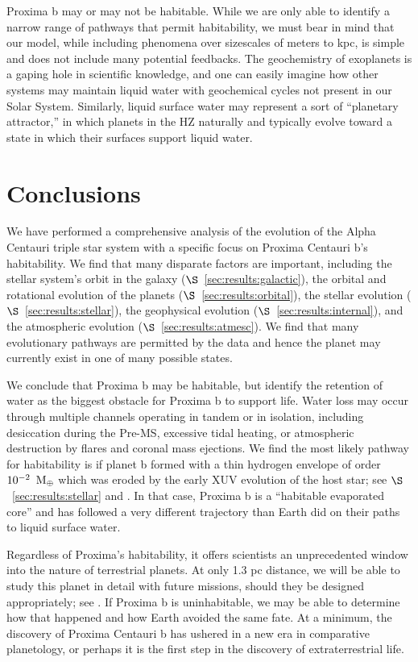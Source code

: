 \documentclass[preprint,12pt]{aastex}
\def\mearth{{\rm\,M_\oplus}}
\begin{document}
Proxima b may or may not be habitable. While we are only able to
identify a narrow range of pathways that permit habitability, we must
bear in mind that our model, while including phenomena over sizescales
of meters to kpc, is simple and does not include many potential
feedbacks. The geochemistry of exoplanets is a gaping hole in
scientific knowledge, and one can easily imagine how other systems may
maintain liquid water with geochemical cycles not present in our Solar
System. Similarly, liquid surface water may represent a sort of
``planetary attractor,'' in which planets in the HZ naturally and
typically evolve toward a state in which their surfaces support liquid
water.

\section{Conclusions\label{sec:concl}}
We have performed a comprehensive analysis of the evolution of the
Alpha Centauri triple star system with a specific focus on Proxima
Centauri b's habitability. We find that many disparate factors are
important, including the stellar system's orbit in the galaxy
($\S$~\ref{sec:results:galactic}), the orbital and rotational
evolution of the planets ($\S$~\ref{sec:results:orbital}), the stellar
evolution ($\S$~\ref{sec:results:stellar}), the geophysical evolution
($\S$~\ref{sec:results:internal}), and the atmospheric evolution
($\S$~\ref{sec:results:atmesc}). We find that many evolutionary
pathways are permitted by the data and hence the planet may currently
exist in one of many possible states.

We conclude that Proxima b may be habitable, but identify the
retention of water as the biggest obstacle for Proxima b to support
life. Water loss may occur through multiple channels operating in
tandem or in isolation, including desiccation during the Pre-MS,
excessive tidal heating, or atmospheric destruction by flares and
coronal mass ejections. We find the most likely pathway for
habitability is if planet b formed with a thin hydrogen envelope of
order $10^{-2}~\mearth$ which was eroded by the early XUV evolution of
the host star; see $\S$~\ref{sec:results:stellar} and
\cite{Luger15}. In that case, Proxima b is a ``habitable evaporated
core'' and has followed a very different trajectory than Earth did on
their paths to liquid surface water.

Regardless of Proxima's habitability, it offers scientists an
unprecedented window into the nature of terrestrial planets. At only
1.3 pc distance, we will be able to study this planet in detail with
future missions, should they be designed appropriately; see
\cite{Meadows16}. If Proxima b is uninhabitable, we may be able to
determine how that happened and how Earth avoided the same fate. At a
minimum, the discovery of Proxima Centauri b has ushered in a new era
in comparative planetology, or perhaps it is the first step in the
discovery of extraterrestrial life.
 
\end{document}
